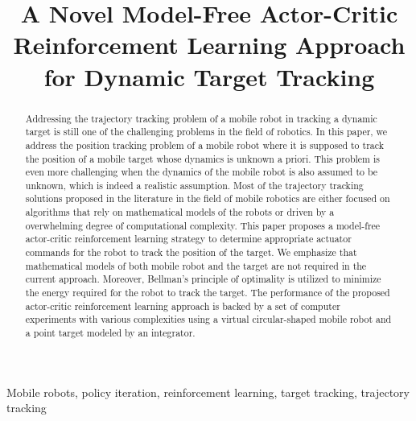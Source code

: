 \documentclass[conference]{IEEEtran}
\begin{document}
\title{A Novel Model-Free Actor-Critic  Reinforcement Learning Approach for Dynamic Target Tracking  
%  
}

\author{%
}

\maketitle

\begin{abstract}
  Addressing the trajectory tracking problem of a mobile robot in tracking a
  dynamic target is still one of the challenging problems in the field of
  robotics. In this paper, we address the position tracking problem of a mobile
  robot where it is supposed to track the position of a  mobile target whose
  dynamics is unknown a priori. This problem is even more challenging when the
  dynamics of the mobile robot is also assumed to be unknown, which is indeed a
  realistic assumption. Most of the trajectory tracking solutions proposed in the
  literature in the field of mobile robotics are either focused on algorithms
  that rely on mathematical models of the robots or driven by a overwhelming
  degree of computational complexity. This paper proposes a model-free
  actor-critic reinforcement learning strategy to determine appropriate actuator
  commands for the robot to track the position of the target. We emphasize that
  mathematical models of both mobile robot and the target are not required in
  the current approach. Moreover, Bellman's principle of optimality is utilized
  to minimize the energy required for the robot to track the target. The
  performance of the proposed actor-critic reinforcement learning approach is
  backed by a set of computer experiments with various complexities using a
  virtual circular-shaped mobile robot and a point target modeled by an
  integrator.
%
\end{abstract}

\begin{IEEEkeywords}
  Mobile robots, policy iteration, reinforcement learning, target tracking, trajectory tracking
\end{IEEEkeywords}
\end{document}
